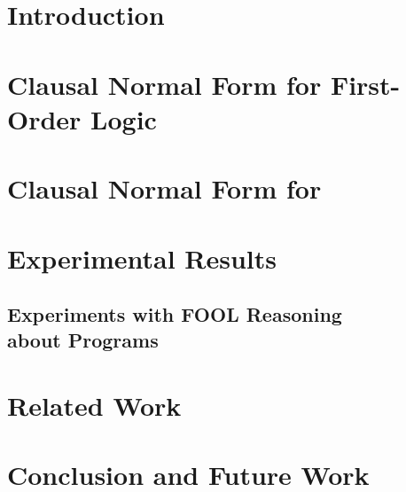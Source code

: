 



\section{Introduction}
\label{sec:newcnf/introduction}


\section{Clausal Normal Form for First-Order Logic}
\label{sec:newcnf/cnf}


\section{Clausal Normal Form for \folb}
\label{sec:newcnf/fool}


\section{Experimental Results}
\label{sec:newcnf/experiments}


\subsection[Experiments with FOOL Reasoning about Programs]{Experiments with FOOL Reasoning\\about Programs}
\label{subsec:PrgAn}


\section{Related Work}
\label{sec:related}


\section{Conclusion and Future Work}
\label{sec:newcnf/conclusions}


